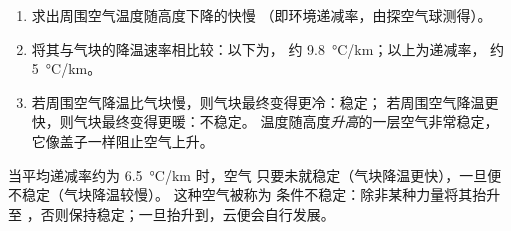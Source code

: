 \begin{method}[这种空气是否稳定？]\label{met:g10:why-clouds-form:stable}
\begin{enumerate}
  \item 求出周围空气温度随高度下降的快慢
        （即环境递减率，由探空气球测得）。
  \item 将其与气块的降温速率相比较：以下为，
        约 \qty{9.8}{\degreeCelsius/km}；以上为递减率，
        约 \qty{5}{\degreeCelsius/km}。
  \item 若周围空气降温比气块慢，则气块最终变得更冷：稳定；
        若周围空气降温更快，则气块最终变得更暖：不稳定。
        温度随高度\emph{升高}的一层空气非常稳定，
        它像盖子一样阻止空气上升。
\end{enumerate}
\end{method}

当平均递减率约为 \qty{6.5}{\degreeCelsius/km} 时，空气
只要未就稳定（气块降温更快），一旦便不稳定（气块降温较慢）。
这种空气被称为
条件不稳定：除非某种力量将其抬升至
，否则保持稳定；一旦抬升到，云便会自行发展。

